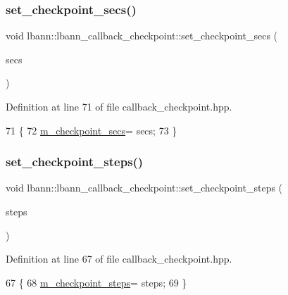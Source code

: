 \subsubsection{\texorpdfstring{set\+\_\+checkpoint\+\_\+secs()}{set\_checkpoint\_secs()}}
{\footnotesize\ttfamily void lbann\+::lbann\+\_\+callback\+\_\+checkpoint\+::set\+\_\+checkpoint\+\_\+secs (\begin{DoxyParamCaption}\item[{\hyperlink{base_8hpp_a3266f5ac18504bbadea983c109566867}{Eval\+Type}}]{secs }\end{DoxyParamCaption})\hspace{0.3cm}{\ttfamily [inline]}}



Definition at line 71 of file callback\+\_\+checkpoint.\+hpp.


\begin{DoxyCode}
71                                                 \{
72     \hyperlink{classlbann_1_1lbann__callback__checkpoint_a285658a96f8546952c9016ef4cc12161}{m\_checkpoint\_secs}= secs;
73   \}
\end{DoxyCode}
\mbox{\label{classlbann_1_1lbann__callback__checkpoint_aa385a1dda770ddf7a801134b96d3fcfd}} 
\subsubsection{\texorpdfstring{set\+\_\+checkpoint\+\_\+steps()}{set\_checkpoint\_steps()}}
{\footnotesize\ttfamily void lbann\+::lbann\+\_\+callback\+\_\+checkpoint\+::set\+\_\+checkpoint\+\_\+steps (\begin{DoxyParamCaption}\item[{int}]{steps }\end{DoxyParamCaption})\hspace{0.3cm}{\ttfamily [inline]}}



Definition at line 67 of file callback\+\_\+checkpoint.\+hpp.


\begin{DoxyCode}
67                                              \{
68     \hyperlink{classlbann_1_1lbann__callback__checkpoint_ad6debea7d9bbebd3ee0323acec11516f}{m\_checkpoint\_steps}= steps;
69   \}
\end{DoxyCode}
\mbox{\label{classlbann_1_1lbann__callback__checkpoint_a383654a7bb70672dfc9fef679f4b509f}} 
